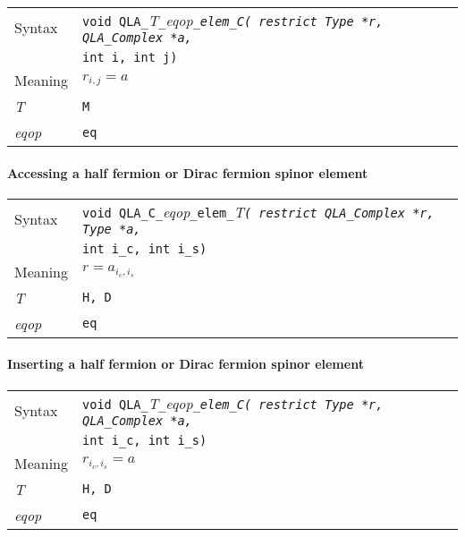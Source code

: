 \documentclass{article}
\newcommand{\tComplex}{QLA\ttdash Complex }
\newcommand{\namespace}{QLA}
\newcommand{\ttdash}{{\tt \_}}
\newcommand{\itt}{\it T}
\newcommand{\extraarg}{}
\begin{document}
\begin{flushleft}
  \begin{tabular}{|l|l|}
  \hline
  Syntax      & {\tt void \namespace}\ttdash\itt\ttdash{\it eqop}\ttdash{\tt elem}\ttdash{\tt C( restrict Type *r, \tComplex *a,}\\
              & {\tt int i, int j\extraarg)} \\
  \hline
  Meaning     & $r_{i,j} = a$\\
  \hline
  \itt        & {\tt M} \\
  \hline
  {\it eqop}  & {\tt eq} \\
  \hline
  \end{tabular}
\end{flushleft}

\paragraph{Accessing a half fermion or Dirac fermion spinor element}

\begin{flushleft}
  \begin{tabular}{|l|l|}
  \hline
  Syntax      & {\tt void \namespace}\ttdash{\tt C}\ttdash{\it eqop}\ttdash{\tt elem}\ttdash\itt{\tt ( restrict \tComplex *r, Type *a,}\\
              & {\tt int i\_c, int i\_s\extraarg)} \\
  \hline
  Meaning     & $r = a_{i_c,i_s}$\\
  \hline
  \itt        & {\tt H, D} \\
  \hline
  {\it eqop}  & {\tt eq} \\
  \hline
  \end{tabular}
\end{flushleft}

\paragraph{Inserting a half fermion or Dirac fermion spinor element}

\begin{flushleft}
  \begin{tabular}{|l|l|}
  \hline
  Syntax      & {\tt void \namespace}\ttdash\itt\ttdash{\it eqop}\ttdash{\tt elem}\ttdash{\tt C( restrict Type *r, \tComplex *a, }\\
              & {\tt int i\_c, int i\_s\extraarg)} \\
  \hline
  Meaning     & $r_{i_c,i_s} = a$\\
  \hline
  \itt        & {\tt H, D} \\
  \hline
  {\it eqop}  & {\tt eq} \\
  \hline
  \end{tabular}
\end{flushleft}
\end{document}
